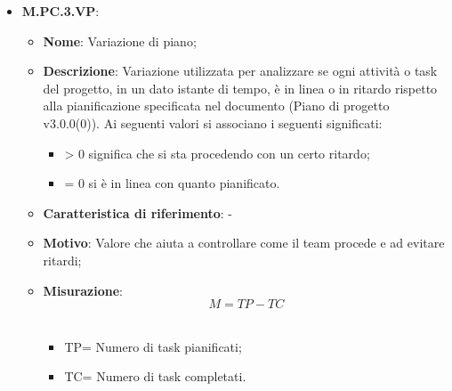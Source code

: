 \documentclass[10pt, a4paper]{article}
\begin{document}
\begin{itemize}
    
    \item \textbf{M.PC.3.VP}:
    \begin{itemize}
        \item \textbf{Nome}: Variazione di piano;
        \item \textbf{Descrizione}: Variazione utilizzata per analizzare se ogni attività o task del progetto, in un dato istante di tempo, è in linea o in ritardo rispetto alla pianificazione specificata nel documento (Piano di progetto v3.0.0(0)).  Ai seguenti valori si associano i seguenti significati:
        \begin{itemize}
            \item > 0 significa che si sta procedendo con un certo ritardo;
            \item = 0 si è in linea con quanto pianificato.
        \end{itemize}
        \item \textbf{Caratteristica di riferimento}: -
        \item \textbf{Motivo}: Valore che aiuta a controllare come il team procede e ad evitare ritardi;
        \item \textbf{Misurazione}: \  \[ M=TP-TC \] \\
        \begin{itemize}
        \item TP= Numero di task pianificati;
        \item TC= Numero di task completati.\\
        \end{itemize}
    \end{itemize}


\end{itemize}
\end{document}
